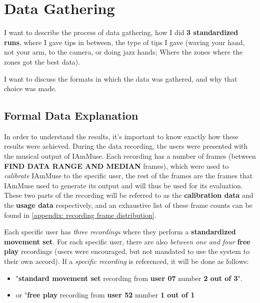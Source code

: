 \section{Data Gathering}
\label{section: experiments - data gathering}
I want to describe the process of data gathering, how I did \textbf{3 standardized runs}, where I gave tips in between, the type of tips I gave (waving your hand, not your arm, to the camera, or doing jazz hands; Where the zones where the zones got the best data).

I want to discuss the formats in which the data was gathered, and why that choice was made.


\subsection{Formal Data Explanation}
\label{sub-section: experiments - data gathering - formal data explanation}

In order to understand the results, it's important to know exactly how these results were achieved.
During the data recording, the users were presented with the musical output of IAmMuse. 
Each recording has a number of frames (between \textbf{FIND DATA RANGE AND MEDIAN} frames), which were used to \textit{calibrate} IAmMuse to the specific user, the rest of the frames are the frames that IAmMuse used to generate its output and will thus be used for its evaluation.
These two parts of the recording will be referred to as the \textbf{calibration data} and the \textbf{usage data} respectively, and an exhaustive list of these frame counts can be found in \cref{appendix: recording frame distribution}.

Each specific user has \textit{three recordings} where they perform a \textbf{standardized movement set}.
For each specific user, there are also \textit{between one and four} \textbf{free play} recordings (users were encouraged, but not mandated to use the system to their own accord).
If a \textit{specific recording} is referenced, it will be done as follows: 
\begin{itemize}
\item "\textbf{standard movement set} recording from \textbf{user 07} number \textbf{2 out of 3}".
\item or "\textbf{free play} recording from \textbf{user 52} number \textbf{1 out of 1}
\end{itemize}

